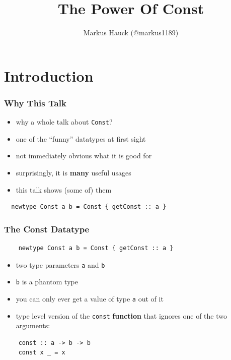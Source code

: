 \documentclass[aspectratio=169]{beamer}
\title{The Power Of Const}
\author{Markus Hauck (@markus1189)}
\begin{document}
\begin{frame}
  \titlepage{}
\end{frame}

\section{Introduction}\label{sec:introduction}

\begin{frame}
  \frametitle{Why This Talk}
  \begin{itemize}
  \item why a whole talk about \texttt{Const}?
  \item one of the ``funny'' datatypes at first sight
  \item not immediately obvious what it is good for
  \item surprisingly, it is \textbf{many} useful usages
  \item this talk shows (some of) them
  \end{itemize}
\end{frame}

\begin{frame}[fragile]
  \begin{center}
    \begin{verbatim}
  newtype Const a b = Const { getConst :: a }
    \end{verbatim}
  \end{center}
\end{frame}

\begin{frame}[fragile]
  \frametitle{The Const Datatype}
  \begin{verbatim}
    newtype Const a b = Const { getConst :: a }
  \end{verbatim}
  \vfill
  \begin{itemize}
  \item two type parameters \texttt{a} and \texttt{b}
  \item \texttt{b} is a phantom type
  \item you can only ever get a value of type \texttt{a} out of it
  \item type level version of the \texttt{const} \textbf{function} that ignores one of
    the two arguments:
  \end{itemize}
  \vspace{5mm}
  \begin{verbatim}
    const :: a -> b -> b
    const x _ = x
  \end{verbatim}
\end{frame}
\end{document}
